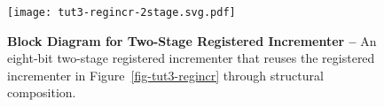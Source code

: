 
\begin{figure}[b]

  \hfill
  \begin{minipage}[t]{0.45\tw}
    \vspace{0pt}

    \texttt{[image: tut3-regincr-2stage.svg.pdf]}
  \end{minipage}
  \hfill%
  \begin{minipage}[t]{0.47\tw}
    \caption{\textbf{Block Diagram for Two-Stage Registered Incrementer
        --} An eight-bit two-stage registered incrementer that reuses the
      registered incrementer in Figure~\ref{fig-tut3-regincr} through
      structural composition.}
    \label{fig-tut3-regincr-2stage}
  \end{minipage}
  \hfill\mbox{}

\end{figure}

